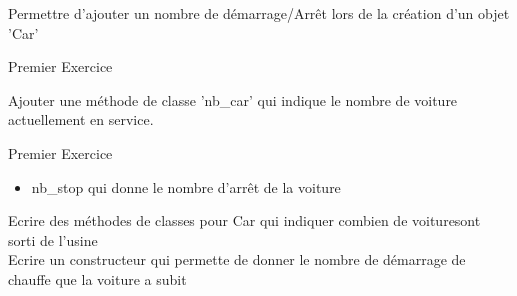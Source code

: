 \documentclass{beamer}
\begin{document}
\begin{frame}
  Permettre d'ajouter un nombre de d\'emarrage/Arrêt lors de la cr\'eation
  d'un objet 'Car'
\end{frame}
\begin{frame}
  \begin{beamerboxesrounded}{Premier Exercice}
    
  \end{beamerboxesrounded}
\end{frame}

\begin{frame}
  Ajouter une m\'ethode de classe 'nb_car' qui indique le nombre de voiture actuellement en
  service.
\end{frame}
\begin{frame}
  \begin{beamerboxesrounded}{Premier Exercice}
    
  \end{beamerboxesrounded}
\end{frame}


\begin{frame}

  \begin{itemize}
    \item nb\_stop qui donne le nombre d'arrêt de la voiture
  \end{itemize}

  Ecrire des m\'ethodes de classes pour Car qui indiquer combien de voituresont sorti de l'usine \\

  Ecrire un constructeur qui permette de donner le nombre de d\'emarrage de chauffe que la voiture a subit

\end{frame}
\end{document}
